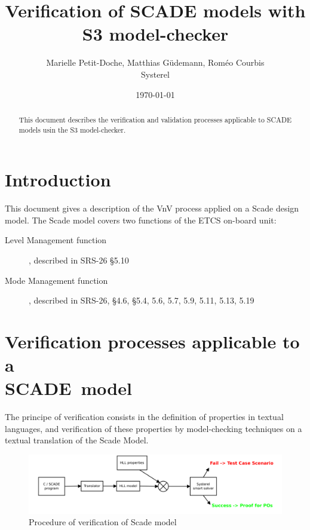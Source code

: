 \documentclass{article}
\title{Verification of SCADE models with S3 model-checker}
\author{Marielle Petit-Doche, Matthias Güdemann, Roméo Courbis\\Systerel}
\date{\today}
\begin{document}
\maketitle

\begin{abstract}
This document describes the verification and validation processes applicable to SCADE models usin the S3 model-checker.
\end{abstract}

\tableofcontents

\newpage

\section{Introduction}

This document gives a description of the VnV process applied on a Scade design model.
The Scade model covers two functions of the ETCS on-board unit:
\begin{description}
\item[Level Management function], described in SRS-26 §5.10
\item[Mode Management function], described in SRS-26, §4.6, §5.4, 5.6, 5.7, 5.9, 5.11, 5.13, 5.19
\end{description}

\section{Verification processes applicable to a\\SCADE~model}

The principe of verification consists in the definition of properties in textual languages, and verification of these properties by model-checking techniques on a textual translation of the Scade Model.


\begin{figure}[h!]
\centering
\includegraphics[width=1\textwidth]{S3_process}
\caption{Procedure of verification of Scade model}
\label{fig:procos}
\end{figure}
\end{document}
